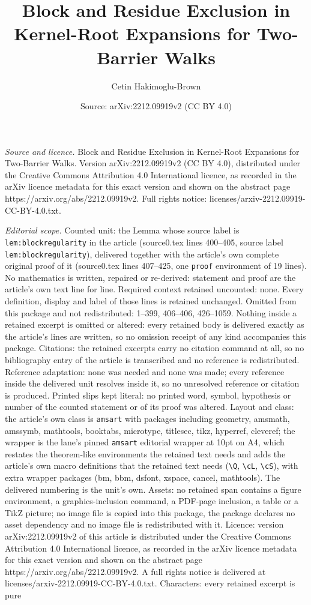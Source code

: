 \documentclass[10pt,a4paper]{amsart}
\title[Block and Residue Exclusion in Kernel-Root Expansions for Tw]{Block and Residue Exclusion in Kernel-Root Expansions for Two-Barrier Walks}
\author{Cetin Hakimoglu-Brown}
\date{Source: arXiv:2212.09919v2 (CC BY 4.0)}
\begin{document}
\maketitle

\noindent\emph{Source and licence.} Block and Residue Exclusion in Kernel-Root Expansions for Two-Barrier Walks. Version arXiv:2212.09919v2 (CC BY 4.0), distributed under the Creative Commons Attribution 4.0 International licence, as recorded in the arXiv licence metadata for this exact version and shown on the abstract page https://arxiv.org/abs/2212.09919v2. Full rights notice: licenses/arxiv-2212.09919-CC-BY-4.0.txt.\par\smallskip

\noindent\textit{Editorial scope.} Counted unit: the Lemma whose source label is \texttt{lem:blockregularity} in the article (source0.tex lines 400--405, source label \texttt{lem:blockregularity}), delivered together with the article's own complete original proof of it (source0.tex lines 407--425, one \texttt{proof} environment of 19 lines). No mathematics is written, repaired or re-derived: statement and proof are the article's own text line for line. Required context retained uncounted: none. Every definition, display and label of those lines is retained unchanged. Omitted from this package and not redistributed: 1--399, 406--406, 426--1059. Nothing inside a retained excerpt is omitted or altered: every retained body is delivered exactly as the article's lines are written, so no omission receipt of any kind accompanies this package. Citations: the retained excerpts carry no citation command at all, so no bibliography entry of the article is transcribed and no reference is redistributed. Reference adaptation: none was needed and none was made; every reference inside the delivered unit resolves inside it, so no unresolved reference or citation is produced. Printed slips kept literal: no printed word, symbol, hypothesis or number of the counted statement or of its proof was altered. Layout and class: the article's own class is \texttt{amsart} with packages including geometry, amsmath, amssymb, mathtools, booktabs, microtype, titlesec, tikz, hyperref, cleveref; the wrapper is the lane's pinned \texttt{amsart} editorial wrapper at 10pt on A4, which restates the theorem-like environments the retained text needs and adds the article's own macro definitions that the retained text needs (\texttt{\textbackslash Q}, \texttt{\textbackslash cL}, \texttt{\textbackslash cS}), with extra wrapper packages (bm, bbm, dsfont, xspace, cancel, mathtools). The delivered numbering is the unit's own. Assets: no retained span contains a figure environment, a graphics-inclusion command, a PDF-page inclusion, a table or a TikZ picture; no image file is copied into this package, the package declares no asset dependency and no image file is redistributed with it. Licence: version arXiv:2212.09919v2 of this article is distributed under the Creative Commons Attribution 4.0 International licence, as recorded in the arXiv licence metadata for this exact version and shown on the abstract page https://arxiv.org/abs/2212.09919v2. A full rights notice is delivered at licenses/arxiv-2212.09919-CC-BY-4.0.txt. Characters: every retained excerpt is pure 
\end{document}
